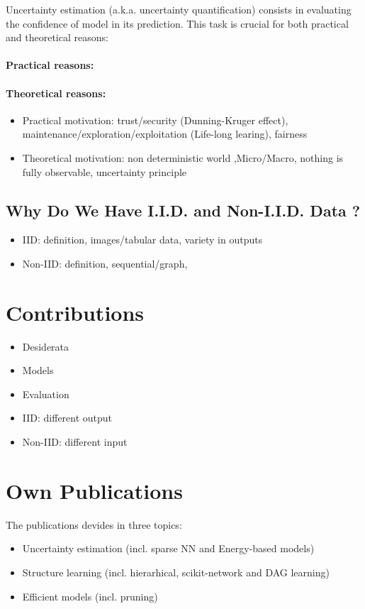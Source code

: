 Uncertainty estimation (a.k.a. uncertainty quantification) consists in evaluating the confidence of model in its prediction. This task is crucial for both practical and theoretical reasons:

\paragraph*{Practical reasons:}

\paragraph*{Theoretical reasons:}

\begin{itemize}
\item Practical motivation: trust/security (Dunning-Kruger effect), maintenance/exploration/exploitation (Life-long learing), fairness
\item Theoretical motivation: non deterministic world ,Micro/Macro, nothing is fully observable, uncertainty principle
\end{itemize}

\subsection{Why Do We Have I.I.D. and Non-I.I.D. Data ?}

\begin{itemize}
    \item IID: definition, images/tabular data, variety in outputs
    \item Non-IID: definition, sequential/graph, 
\end{itemize}

\section{Contributions}

\begin{itemize}
    \item Desiderata
    \item Models
    \item Evaluation
\end{itemize}

\begin{itemize}
    \item IID: different output
    \item Non-IID: different input
\end{itemize}

\section{Own Publications}

The publications devides in three topics:
\begin{itemize}
\item Uncertainty estimation (incl. sparse NN and Energy-based models)
\item Structure learning (incl. hierarhical, scikit-network and DAG learning)
\item Efficient models (incl. pruning)
\end{itemize}